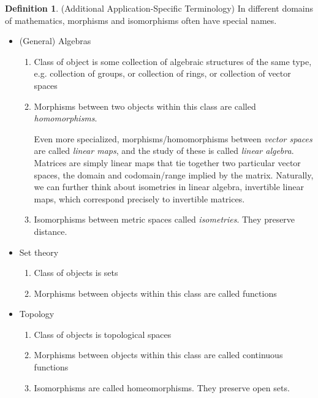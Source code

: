 \documentclass[12pt]{book}
\numberwithin{equation}{section} %
\theoremstyle{plain}
\theoremstyle{definition}
\newtheorem{defn}[thm]{Definition}
\theoremstyle{remark}
\begin{document}
\begin{defn}(Additional Application-Specific Terminology)
In different domains of mathematics, morphisms and isomorphisms often
have special names.
\begin{itemize}
  \item (General) Algebras
    \begin{enumerate}[label=(\roman*)]
      \item Class of object is some collection of algebraic structures
        of the same type, e.g. collection of groups, or collection of
        rings, or collection of vector spaces

      \item Morphisms between two objects within this class are called
        \emph{homomorphisms}.

        Even more specialized, morphisms/homomorphisms between
        \emph{vector spaces} are called \emph{linear maps}, and the
        study of these is called \emph{linear algebra}.
        Matrices are simply linear maps that tie together two particular
        vector spaces, the domain and codomain/range implied by the
        matrix.
        Naturally, we can further think about isometries in linear
        algebra, invertible linear maps, which correspond precisely to
        invertible matrices.

      \item  Isomorphisms between metric spaces called
        \emph{isometries}.
        They preserve distance.
    \end{enumerate}

  \item Set theory
    \begin{enumerate}[label=(\roman*)]
      \item Class of objects is sets
      \item Morphisms between objects within this class are called
        functions
    \end{enumerate}
  \item Topology
    \begin{enumerate}[label=(\roman*)]
      \item Class of objects is topological spaces
      \item Morphisms between objects within this class are called
        continuous functions
      \item Isomorphisms are called homeomorphisms.
        They preserve open sets.
    \end{enumerate}
\end{itemize}
\end{defn}
\end{document}
